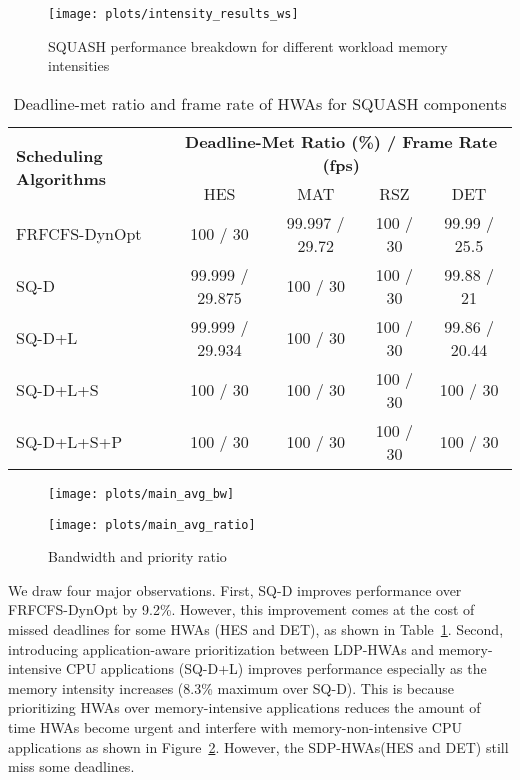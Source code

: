 \documentclass[10pt,letterpaper]{article}
\newcommand{\ldphwas}[0]{LDP-HWAs\xspace}
\newcommand{\sdphwas}[0]{SDP-HWAs\xspace}
\begin{document}
\begin{figure}[h]
  \centering
    \texttt{[image: plots/intensity\_results\_ws]}
\caption{SQUASH performance breakdown for different workload memory intensities}
  \label{plot:intensity_results}
\vspace{-3mm}
\end{figure}




\begin{table}[h]
\footnotesize
\centering
\setlength{\tabcolsep}{.60em}
    \begin{tabular}{lcccc}
      \toprule
\multirow{2}{*}{\textbf{Scheduling Algorithms}} &
      \multicolumn{4}{c}{\textbf{Deadline-Met Ratio (\%) / Frame Rate (fps)}} \\
       & HES & MAT & RSZ & DET \\
      \midrule

    FRFCFS-DynOpt & 100 / 30 & 99.997 / 29.72 & 100 / 30 & 99.99 / 25.5 \\ 
SQ-D & 99.999 / 29.875 &  100 / 30 & 100 / 30 & 99.88 / 21 \\
    SQ-D+L & 99.999 / 29.934 & 100 / 30 & 100 / 30 & 99.86 / 20.44 \\
    SQ-D+L+S & 100 / 30 & 100 / 30 & 100 / 30 & 100 / 30 \\
    SQ-D+L+S+P & 100 / 30 & 100 / 30 & 100 / 30 & 100 / 30 \\

      \bottomrule
    \end{tabular}
\caption{Deadline-met ratio and frame rate of HWAs for SQUASH components}
\label{tab:average_hwa_performance2}\vspace{-2mm}
\end{table}
 

\begin{figure}[h]
\centering
  \begin{minipage}{0.40\textwidth}
    \centering
    \texttt{[image: plots/main\_avg\_bw]}
  \end{minipage}
  \begin{minipage}{0.40\textwidth}
    \centering
    \texttt{[image: plots/main\_avg\_ratio]}
  \end{minipage}
\caption{Bandwidth and priority ratio}
  \label{plot:bw_ratio_hwa}
\end{figure}


We draw four major observations. First, SQ-D improves performance over
FRFCFS-DynOpt by 9.2\%. However, this improvement comes at the cost of missed
deadlines for some HWAs (HES and DET), as shown in
Table~\ref{tab:average_hwa_performance2}. Second, introducing application-aware
prioritization between \ldphwas and memory-intensive CPU applications (SQ-D+L)
improves performance especially as the memory intensity increases (8.3\% maximum over SQ-D). 
This is because prioritizing HWAs over memory-intensive applications reduces 
the amount of time HWAs become urgent and interfere with memory-non-intensive CPU applications 
as shown in Figure~\ref{plot:bw_ratio_hwa}. However, the \sdphwas (HES and DET)
still miss some deadlines.
\end{document}
